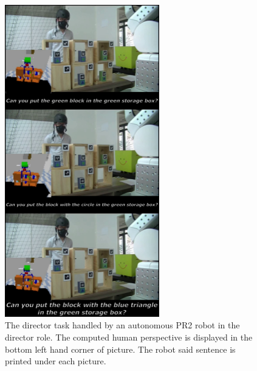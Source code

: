 \documentclass[a4paper,11pt,twoside]{StyleThese}
\begin{document}
\begin{figure}[hbtp]
\centering
\includegraphics[width=0.6\textwidth]{figures/chapter5/dt_demo.png}
\caption{The director task handled by an autonomous PR2 robot in the director role. The computed human perspective is displayed in the bottom left hand corner of picture. The robot said sentence is printed under each picture.}
\label{fig:chap5dtdemodirector}
\end{figure}
\end{document}
